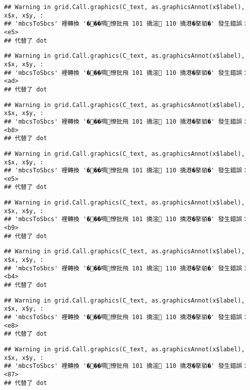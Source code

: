 \documentclass[
]{article}
\begin{document}
\begin{verbatim}
## Warning in grid.Call.graphics(C_text, as.graphicsAnnot(x$label), x$x, x$y, :
## 'mbcsToSbcs' 裡轉換 '���啁憭批飛 101 撟渲 110 撟港�摮貊�' 發生錯誤：<e5>
## 代替了 dot
\end{verbatim}

\begin{verbatim}
## Warning in grid.Call.graphics(C_text, as.graphicsAnnot(x$label), x$x, x$y, :
## 'mbcsToSbcs' 裡轉換 '���啁憭批飛 101 撟渲 110 撟港�摮貊�' 發生錯誤：<ad>
## 代替了 dot
\end{verbatim}

\begin{verbatim}
## Warning in grid.Call.graphics(C_text, as.graphicsAnnot(x$label), x$x, x$y, :
## 'mbcsToSbcs' 裡轉換 '���啁憭批飛 101 撟渲 110 撟港�摮貊�' 發生錯誤：<b8>
## 代替了 dot
\end{verbatim}

\begin{verbatim}
## Warning in grid.Call.graphics(C_text, as.graphicsAnnot(x$label), x$x, x$y, :
## 'mbcsToSbcs' 裡轉換 '���啁憭批飛 101 撟渲 110 撟港�摮貊�' 發生錯誤：<e5>
## 代替了 dot
\end{verbatim}

\begin{verbatim}
## Warning in grid.Call.graphics(C_text, as.graphicsAnnot(x$label), x$x, x$y, :
## 'mbcsToSbcs' 裡轉換 '���啁憭批飛 101 撟渲 110 撟港�摮貊�' 發生錯誤：<b9>
## 代替了 dot
\end{verbatim}

\begin{verbatim}
## Warning in grid.Call.graphics(C_text, as.graphicsAnnot(x$label), x$x, x$y, :
## 'mbcsToSbcs' 裡轉換 '���啁憭批飛 101 撟渲 110 撟港�摮貊�' 發生錯誤：<b4>
## 代替了 dot
\end{verbatim}

\begin{verbatim}
## Warning in grid.Call.graphics(C_text, as.graphicsAnnot(x$label), x$x, x$y, :
## 'mbcsToSbcs' 裡轉換 '���啁憭批飛 101 撟渲 110 撟港�摮貊�' 發生錯誤：<e8>
## 代替了 dot
\end{verbatim}

\begin{verbatim}
## Warning in grid.Call.graphics(C_text, as.graphicsAnnot(x$label), x$x, x$y, :
## 'mbcsToSbcs' 裡轉換 '���啁憭批飛 101 撟渲 110 撟港�摮貊�' 發生錯誤：<87>
## 代替了 dot
\end{verbatim}
\end{document}

